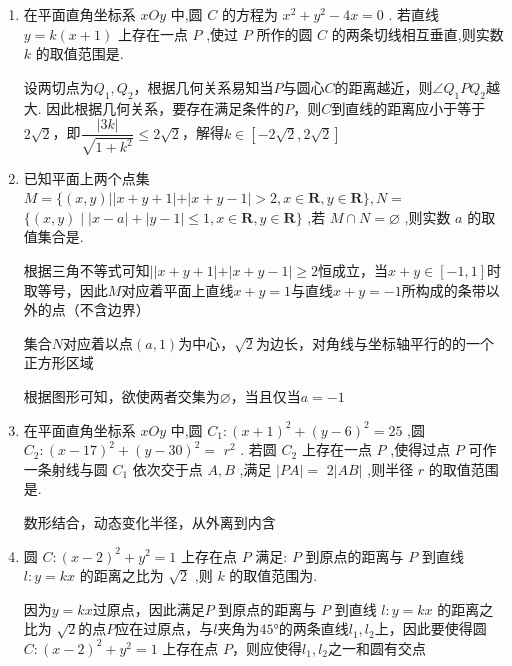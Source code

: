 \begin{enumerate}
\begin{jieda}
        根据几何关系已知$x_0 \in [-1, 1]$
    \end{jieda}
    \item 在平面直角坐标系 ${xOy}$ 中,圆 $C$ 的方程为 ${x}^{2} + {y}^{2} - {4x} = 0$ . 若直线 $y = k\left( {x + 1}\right)$ 上存在一点 $P$ ,使过 $P$ 所作的圆 $C$ 的两条切线相互垂直,则实数 $k$ 的取值范围是.
    \begin{jieda}
        设两切点为$Q_1, Q_2$，根据几何关系易知当$P$与圆心$C$的距离越近，则$\angle{Q_1PQ_2}$越大. 因此根据几何关系，要存在满足条件的$P$，则$C$到直线的距离应小于等于$2\sqrt{2}$，即$\dfrac{|3k|}{\sqrt{1+k^2}} \leq 2\sqrt{2}$，解得$k \in [-2\sqrt{2}, 2\sqrt{2}]$
    \end{jieda}
    \item 已知平面上两个点集 $M = \{ \left( {x,y}\right) \left| \right| x + y + 1\left| +\right| x + y - 1 \mid > 2,x \in  \mathbf{R},y \in  \mathbf{R}\} ,N =$  $\{ \left( {x,y}\right)  \mid  \left| {x - a}\right|  + \left| {y - 1}\right|  \leq  1,x \in  \mathbf{R},y \in  \mathbf{R}\}$ ,若 $M \cap  N = \varnothing$ ,则实数 $a$ 的取值集合是.
    \begin{jieda}
        根据三角不等式可知$\left| \right| x + y + 1\left| +\right| x + y - 1 \mid \geq 2$恒成立，当$x+y \in [-1, 1]$时取等号，因此$M$对应着平面上直线$x+y = 1$与直线$x+y = -1$所构成的条带以外的点（不含边界）

        集合$N$对应着以点$(a, 1)$为中心，$\sqrt{2}$为边长，对角线与坐标轴平行的的一个正方形区域

        根据图形可知，欲使两者交集为$\varnothing$，当且仅当$a = -1$
    \end{jieda}
    \item 在平面直角坐标系 ${xOy}$ 中,圆 ${C}_{1} : {\left( x + 1\right) }^{2} + {\left( y - 6\right) }^{2} = {25}$ ,圆 ${C}_{2} : {\left( x - {17}\right) }^{2} + {\left( y - {30}\right) }^{2} =$  ${r}^{2}$ . 若圆 ${C}_{2}$ 上存在一点 $P$ ,使得过点 $P$ 可作一条射线与圆 ${C}_{1}$ 依次交于点 $A,B$ ,满足 $\left| {PA}\right|  =$  $2\left| {AB}\right|$ ,则半径 $r$ 的取值范围是\blkda{$[5, 55]$}.
    \begin{jieda}
        数形结合，动态变化半径，从外离到内含
    \end{jieda}
    \item 圆 $C : {\left( x - 2\right) }^{2} + {y}^{2} = 1$ 上存在点 $P$ 满足: $P$ 到原点的距离与 $P$ 到直线 $l : y = {kx}$ 的距离之比为 $\sqrt{2}$ ,则 $k$ 的取值范围为.
    \begin{jieda}
        因为$y = kx$过原点，因此满足$P$ 到原点的距离与 $P$ 到直线 $l : y = {kx}$ 的距离之比为 $\sqrt{2}$的点$P$应在过原点，与$l$夹角为$\ang{45}$的两条直线$l_1, l_2$上，因此要使得圆 $C : {\left( x - 2\right) }^{2} + {y}^{2} = 1$ 上存在点 $P$，则应使得$l_1, l_2$之一和圆有交点


\end{jieda}
\end{enumerate}
